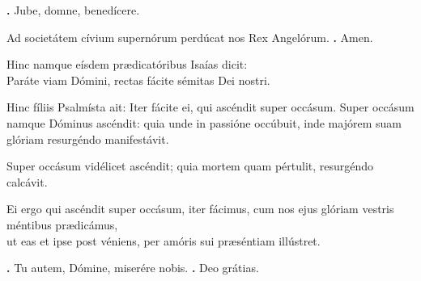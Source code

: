 \begin{small}
\textbf{\Vbar.} Jube, domne, benedícere.

Ad societátem cívium supernórum perdúcat nos Rex Angelórum.
\textbf{\Rbar.} Amen.
\end{small}


Hinc namque eísdem prædicatóribus Isaías dicit: \\
Paráte viam Dómini, rectas fácite sémitas Dei nostri. 

Hinc fíliis Psalmísta ait: Iter fácite ei, qui ascéndit super occásum. Super occásum namque Dóminus ascéndit: quia unde in passióne occúbuit, inde majórem suam glóriam resurgéndo manifestávit. 

Super occásum vidélicet ascéndit; quia mortem quam pértulit, resurgéndo calcávit. 

Ei ergo qui ascéndit super occásum, iter fácimus, cum nos ejus glóriam vestris méntibus prædicámus, \\
ut eas et ipse post véniens, per amóris sui præséntiam illústret.

\textbf{\Vbar.} Tu autem, Dómine, miserére nobis.
\textbf{\Rbar.} Deo grátias.

